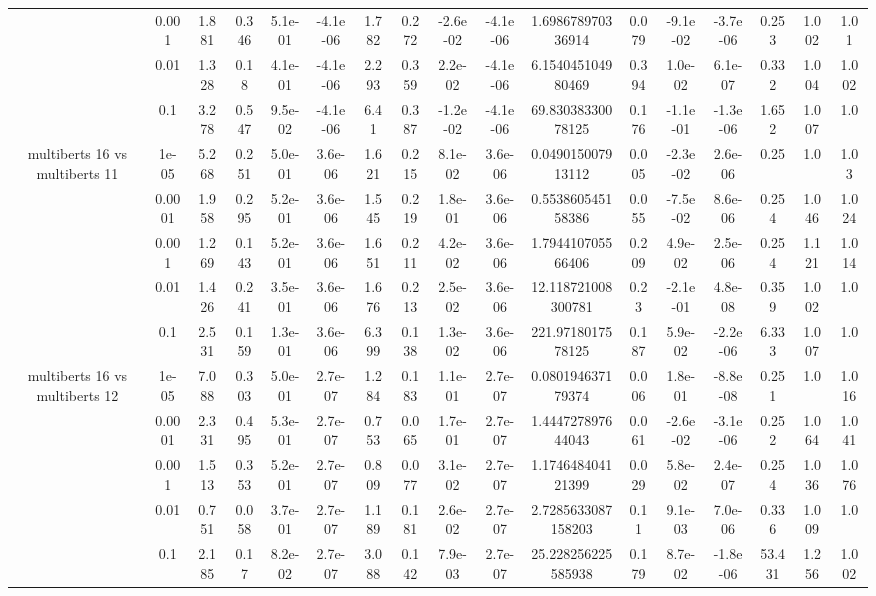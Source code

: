 \begin{tabular}{|c|c|c|c|c|c|c|c|c|c|c|c|c|c|c|c|c|}
 & 0.001 & 1.881 & 0.346 & 5.1e-01 & -4.1e-06 & 1.782 & 0.272 & -2.6e-02 & -4.1e-06 & 1.698678970336914 & 0.079 & -9.1e-02 & -3.7e-06 & 0.253 & 1.002 & 1.01 \\
 & 0.01 & 1.328 & 0.18 & 4.1e-01 & -4.1e-06 & 2.293 & 0.359 & 2.2e-02 & -4.1e-06 & 6.154045104980469 & 0.394 & 1.0e-02 & 6.1e-07 & 0.332 & 1.004 & 1.002 \\
 & 0.1 & 3.278 & 0.547 & 9.5e-02 & -4.1e-06 & 6.41 & 0.387 & -1.2e-02 & -4.1e-06 & 69.83038330078125 & 0.176 & -1.1e-01 & -1.3e-06 & 1.652 & 1.007 & 1.0 \\
\hline
\multirow{5}{*}{multiberts 16 vs multiberts 11} & 1e-05 & 5.268 & 0.251 & 5.0e-01 & 3.6e-06 & 1.621 & 0.215 & 8.1e-02 & 3.6e-06 & 0.049015007913112 & 0.005 & -2.3e-02 & 2.6e-06 & 0.25 & 1.0 & 1.03 \\
 & 0.0001 & 1.958 & 0.295 & 5.2e-01 & 3.6e-06 & 1.545 & 0.219 & 1.8e-01 & 3.6e-06 & 0.553860545158386 & 0.055 & -7.5e-02 & 8.6e-06 & 0.254 & 1.046 & 1.024 \\
 & 0.001 & 1.269 & 0.143 & 5.2e-01 & 3.6e-06 & 1.651 & 0.211 & 4.2e-02 & 3.6e-06 & 1.794410705566406 & 0.209 & 4.9e-02 & 2.5e-06 & 0.254 & 1.121 & 1.014 \\
 & 0.01 & 1.426 & 0.241 & 3.5e-01 & 3.6e-06 & 1.676 & 0.213 & 2.5e-02 & 3.6e-06 & 12.118721008300781 & 0.23 & -2.1e-01 & 4.8e-08 & 0.359 & 1.002 & 1.0 \\
 & 0.1 & 2.531 & 0.159 & 1.3e-01 & 3.6e-06 & 6.399 & 0.138 & 1.3e-02 & 3.6e-06 & 221.9718017578125 & 0.187 & 5.9e-02 & -2.2e-06 & 6.333 & 1.007 & 1.0 \\
\hline
\multirow{5}{*}{multiberts 16 vs multiberts 12} & 1e-05 & 7.088 & 0.303 & 5.0e-01 & 2.7e-07 & 1.284 & 0.183 & 1.1e-01 & 2.7e-07 & 0.080194637179374 & 0.006 & 1.8e-01 & -8.8e-08 & 0.251 & 1.0 & 1.016 \\
 & 0.0001 & 2.331 & 0.495 & 5.3e-01 & 2.7e-07 & 0.753 & 0.065 & 1.7e-01 & 2.7e-07 & 1.444727897644043 & 0.061 & -2.6e-02 & -3.1e-06 & 0.252 & 1.064 & 1.041 \\
 & 0.001 & 1.513 & 0.353 & 5.2e-01 & 2.7e-07 & 0.809 & 0.077 & 3.1e-02 & 2.7e-07 & 1.174648404121399 & 0.029 & 5.8e-02 & 2.4e-07 & 0.254 & 1.036 & 1.076 \\
 & 0.01 & 0.751 & 0.058 & 3.7e-01 & 2.7e-07 & 1.189 & 0.181 & 2.6e-02 & 2.7e-07 & 2.7285633087158203 & 0.11 & 9.1e-03 & 7.0e-06 & 0.336 & 1.009 & 1.0 \\
 & 0.1 & 2.185 & 0.17 & 8.2e-02 & 2.7e-07 & 3.088 & 0.142 & 7.9e-03 & 2.7e-07 & 25.228256225585938 & 0.179 & 8.7e-02 & -1.8e-06 & 53.431 & 1.256 & 1.002 \\

\end{tabular}
